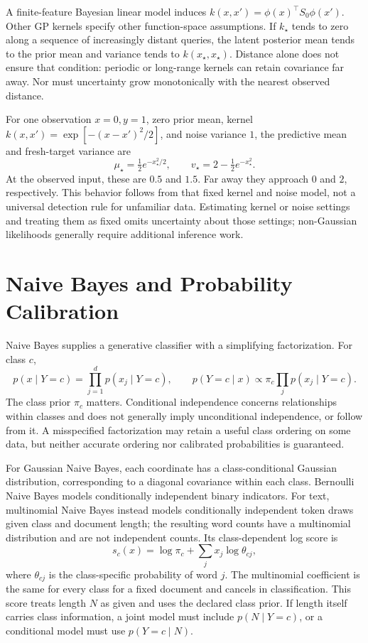 A finite-feature Bayesian linear model induces $k(x,x')=\phi(x)^\top S_0\phi(x')$. Other GP kernels specify other function-space assumptions. If $k_\star$ tends to zero along a sequence of increasingly distant queries, the latent posterior mean tends to the prior mean and variance tends to $k(x_\star,x_\star)$. Distance alone does not ensure that condition: periodic or long-range kernels can retain covariance far away. Nor must uncertainty grow monotonically with the nearest observed distance.

For one observation $x=0,y=1$, zero prior mean, kernel $k(x,x')=\exp[-(x-x')^2/2]$, and noise variance $1$, the predictive mean and fresh-target variance are
\[
\mu_\star=\tfrac12e^{-x_\star^2/2},\qquad
v_\star=2-\tfrac12e^{-x_\star^2}.
\]
At the observed input, these are $0.5$ and $1.5$. Far away they approach $0$ and $2$, respectively. This behavior follows from that fixed kernel and noise model, not a universal detection rule for unfamiliar data. Estimating kernel or noise settings and treating them as fixed omits uncertainty about those settings; non-Gaussian likelihoods generally require additional inference work.

\section{Naive Bayes and Probability Calibration}
\label{sec:naive-bayes}

Naive Bayes supplies a generative classifier with a simplifying factorization. For class $c$,
\[
p(x\mid Y=c)=\prod_{j=1}^d p(x_j\mid Y=c),
\qquad
p(Y=c\mid x)\propto\pi_c\prod_jp(x_j\mid Y=c).
\]
The class prior $\pi_c$ matters. Conditional independence concerns relationships within classes and does not generally imply unconditional independence, or follow from it. A misspecified factorization may retain a useful class ordering on some data, but neither accurate ordering nor calibrated probabilities is guaranteed.

For Gaussian Naive Bayes, each coordinate has a class-conditional Gaussian distribution, corresponding to a diagonal covariance within each class. Bernoulli Naive Bayes models conditionally independent binary indicators. For text, multinomial Naive Bayes instead models conditionally independent token draws given class and document length; the resulting word counts have a multinomial distribution and are not independent counts. Its class-dependent log score is
\[
s_c(x)=\log\pi_c+\sum_j x_j\log\theta_{cj},
\]
where $\theta_{cj}$ is the class-specific probability of word $j$. The multinomial coefficient is the same for every class for a fixed document and cancels in classification. This score treats length $N$ as given and uses the declared class prior. If length itself carries class information, a joint model must include $p(N\mid Y=c)$, or a conditional model must use $p(Y=c\mid N)$.

